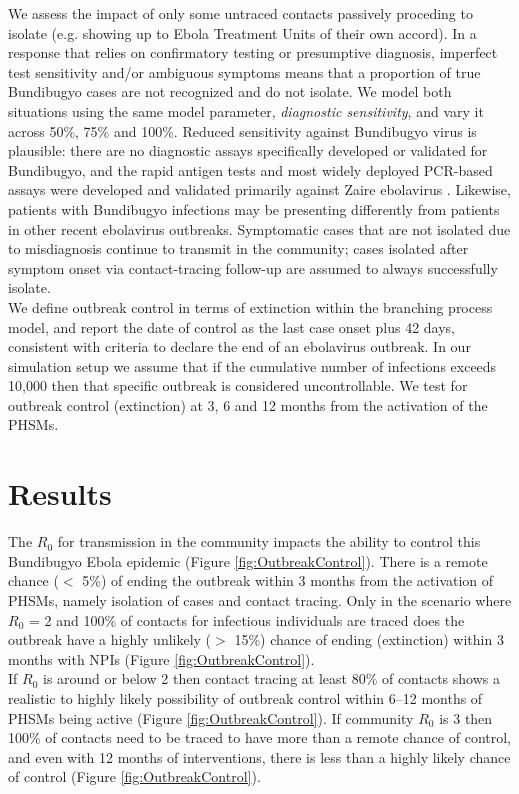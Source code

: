 \documentclass[12pt, letterpaper]{article}
\begin{document}
We assess the impact of only some untraced contacts passively proceding to isolate (e.g. showing up to Ebola Treatment Units of their own accord). In a response that relies on confirmatory testing or presumptive diagnosis, imperfect test sensitivity and/or ambiguous symptoms means that a proportion of true Bundibugyo cases are not recognized and do not isolate. We model both situations using the same model parameter, \textit{diagnostic sensitivity}, and vary it across 50\%, 75\% and 100\%. Reduced sensitivity against Bundibugyo virus is plausible: there are no diagnostic assays specifically developed or validated for Bundibugyo, and the rapid antigen tests and most widely deployed PCR-based assays were developed and validated primarily against Zaire ebolavirus \citep{broadhurst2016diagnostics}. Likewise, patients with Bundibugyo infections may be presenting differently from patients in other recent ebolavirus outbreaks. Symptomatic cases that are not isolated due to misdiagnosis continue to transmit in the community; cases isolated after symptom onset via contact-tracing follow-up are assumed to always successfully isolate. \\

We define outbreak control in terms of extinction within the branching process model, and report the date of control as the last case onset plus 42 days, consistent with criteria to declare the end of an ebolavirus outbreak. In our simulation setup we assume that if the cumulative number of infections exceeds 10,000 then that specific outbreak is considered uncontrollable. We test for outbreak control (extinction) at 3, 6 and 12 months from the activation of the PHSMs.

\section*{Results}

The $R_0$ for transmission in the community impacts the ability to control this Bundibugyo Ebola epidemic (Figure \ref{fig:OutbreakControl}). There is a remote chance ($<$ 5\%) of ending the outbreak within 3 months from the activation of PHSMs, namely isolation of cases and contact tracing. Only in the scenario where $R_0$ = 2 and 100\% of contacts for infectious individuals are traced does the outbreak have a highly unlikely ($>$ 15\%) chance of ending (extinction) within 3 months with NPIs (Figure \ref{fig:OutbreakControl}). \\

If $R_0$ is around or below 2 then contact tracing at least 80\% of contacts shows a realistic to highly likely possibility of outbreak control within 6--12 months of PHSMs being active (Figure \ref{fig:OutbreakControl}). If community $R_0$ is 3 then 100\% of contacts need to be traced to have more than a remote chance of control, and even with 12 months of interventions, there is less than a highly likely chance of control (Figure \ref{fig:OutbreakControl}). \\
\end{document}
